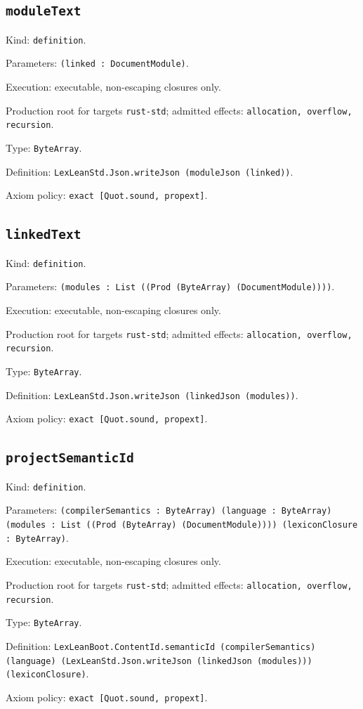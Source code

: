 \documentclass[11pt]{article}
\begin{document}
\subsection*{\texttt{moduleText}}
\noindent Kind: \texttt{definition}.\par
\noindent Parameters: \texttt{(linked : DocumentModule)}.\par
\noindent Execution: executable, non-escaping closures only.\par
\noindent Production root for targets \texttt{rust-std}; admitted effects: \texttt{allocation, overflow, recursion}.\par
\noindent Type: \texttt{ByteArray}.\par
\noindent Definition: \texttt{LexLeanStd.Json.writeJson (moduleJson (linked))}.\par
\noindent Axiom policy: \texttt{exact [Quot.sound, propext]}.\par
\subsection*{\texttt{linkedText}}
\noindent Kind: \texttt{definition}.\par
\noindent Parameters: \texttt{(modules : List ((Prod (ByteArray) (DocumentModule))))}.\par
\noindent Execution: executable, non-escaping closures only.\par
\noindent Production root for targets \texttt{rust-std}; admitted effects: \texttt{allocation, overflow, recursion}.\par
\noindent Type: \texttt{ByteArray}.\par
\noindent Definition: \texttt{LexLeanStd.Json.writeJson (linkedJson (modules))}.\par
\noindent Axiom policy: \texttt{exact [Quot.sound, propext]}.\par
\subsection*{\texttt{projectSemanticId}}
\noindent Kind: \texttt{definition}.\par
\noindent Parameters: \texttt{(compilerSemantics : ByteArray) (language : ByteArray) (modules : List ((Prod (ByteArray) (DocumentModule)))) (lexiconClosure : ByteArray)}.\par
\noindent Execution: executable, non-escaping closures only.\par
\noindent Production root for targets \texttt{rust-std}; admitted effects: \texttt{allocation, overflow, recursion}.\par
\noindent Type: \texttt{ByteArray}.\par
\noindent Definition: \texttt{LexLeanBoot.ContentId.semanticId (compilerSemantics) (language) (LexLeanStd.Json.writeJson (linkedJson (modules))) (lexiconClosure)}.\par
\noindent Axiom policy: \texttt{exact [Quot.sound, propext]}.\par
\end{document}
